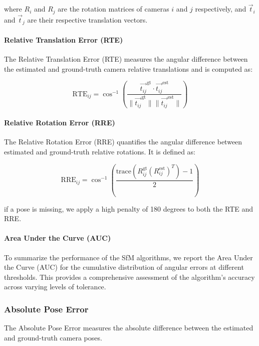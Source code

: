 where \( R_i \) and \( R_j \) are the rotation matrices of cameras \( i \) and \( j \) respectively, and \( \vec{t}_i \) and \( \vec{t}_j \) are their respective translation vectors.

\paragraph{Relative Translation Error (RTE)}
The Relative Translation Error (RTE) measures the angular difference between the estimated and ground-truth camera relative translations and is computed as:

\begin{equation}
    \text{RTE}_{ij} = \cos^{-1}\left(\frac{\vec{t_{ij}}^{\text{gt}} \cdot \vec{t_{ij}}^{\text{est}}}{\lVert \vec{t_{ij}}^{\text{gt}} \rVert \lVert \vec{t_{ij}}^{\text{est}} \rVert}\right)
\end{equation}

\paragraph{Relative Rotation Error (RRE)}
The Relative Rotation Error (RRE) quantifies the angular difference between estimated and ground-truth relative rotations. It is defined as:

\begin{equation}
    \text{RRE}_{ij} = \cos^{-1}\left(\frac{\text{trace}(R_{ij}^{\text{gt}} (R_{ij}^{\text{est}})^T) - 1}{2}\right)
\end{equation}


if a pose is missing, we apply a high penalty of 180 degrees to both the RTE and RRE.


\paragraph{Area Under the Curve (AUC)}
To summarize the performance of the SfM algorithms, we report the Area Under the Curve (AUC) for the cumulative distribution of angular errors at different thresholds. 
This provides a comprehensive assessment of the algorithm's accuracy across varying levels of tolerance.

\subsubsection{Absolute Pose Error}
The Absolute Pose Error measures the absolute difference between the estimated and ground-truth camera poses.

